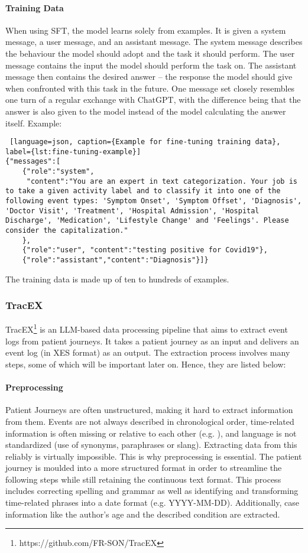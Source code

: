 \paragraph{Training Data}
When using SFT, the model learns solely from examples. It is given a system message, a user message, and an assistant message. The system message describes the behaviour the model should adopt and the task it should perform. The user message contains the input the model should perform the task on. The assistant message then contains the desired answer – the response the model should give when confronted with this task in the future.
One message set closely resembles one turn of a regular exchange with ChatGPT, with the difference being that the answer is also given to the model instead of the model calculating the answer itself.
Example:
\begin{lstlisting} [language=json, caption={Example for fine-tuning training data}, label={lst:fine-tuning-example}]   
{"messages":[
    {"role":"system",
     "content":"You are an expert in text categorization. Your job is to take a given activity label and to classify it into one of the following event types: 'Symptom Onset', 'Symptom Offset', 'Diagnosis', 'Doctor Visit', 'Treatment', 'Hospital Admission', 'Hospital Discharge', 'Medication', 'Lifestyle Change' and 'Feelings'. Please consider the capitalization."
    },
    {"role":"user", "content":"testing positive for Covid19"},
    {"role":"assistant","content":"Diagnosis"}]}
\end{lstlisting}
The training data is made up of ten to hundreds of examples.

\subsubsection*{TracEX}\label{sec:tracex}
TracEX\footnote{https://github.com/FR-SON/TracEX} is an LLM-based data processing pipeline that aims to extract event logs from patient journeys. It takes a patient journey as an input and delivers an event log (in XES format) as an output. The extraction process involves many steps, some of which will be important later on. Hence, they are listed below:
\paragraph{Preprocessing} Patient Journeys are often unstructured, making it hard to extract information from them. Events are not always described in chronological order, time-related information is often missing or relative to each other (e.g. ), and language is not standardized (use of synonyms, paraphrases or slang). Extracting data from this reliably is virtually impossible. This is why preprocessing is essential. The patient journey is moulded into a more structured format in order to streamline the following steps while still retaining the continuous text format. This process includes correcting spelling and grammar as well as identifying and transforming time-related phrases into a date format (e.g. YYYY-MM-DD). Additionally, case information like the author's age and the described condition are extracted.
